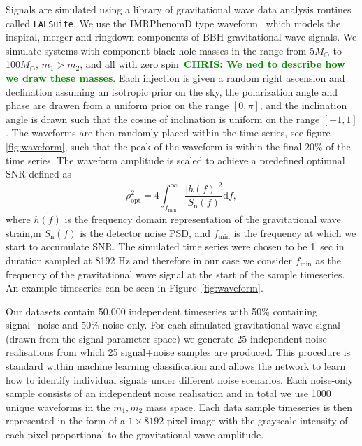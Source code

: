 \documentclass[%
 amsmath,amssymb,
 aps,
 twocolumn,
 prl,
 reprint,
floatfix,
]{revtex4-1}
\newcommand{\chris}[1]{\textbf{\textcolor{green}{CHRIS: #1}}}
\begin{document}
%
%
Signals are simulated using a library of gravitational wave data analysis
routines called \texttt{LALSuite}. We use the IMRPhenomD type
waveform~\cite{PhysRevD.93.044006, PhysRevD.93.044007} which models the
inspiral, merger and ringdown components of \ac{BBH} gravitational wave
signals. We simulate systems with component black hole masses in the range from
5\(M_\odot\) to 100\(M_\odot\), $m_{1} > m_{2}$, and all with zero
spin~\chris{We ned to describe how we draw these masses}. Each
injection is given a random right ascension and declination assuming an
isotropic prior on the sky, the polarization angle and phase are drawen from a
uniform prior on the range $[0,\pi]$, and the inclination angle is drawn such
that the cosine of inclination is uniform on the range $[-1,1]$. The waveforms
are then randomly placed within the time series, see figure \ref{fig:waveform},
such that the peak of the waveform is within the final $20$\% of the time
series. The waveform amplitude is scaled to achieve a predefined optimnal
\ac{SNR} defined as
%
%
\begin{equation} \label{eq:snr}
\rho_{\mathrm{opt}}^{2} = 4 \int_{f_{\mathrm{min}}}^{\infty} \frac{\lvert
\tilde{h(f)}\rvert^{2}}{S_{\mathrm{n}}(f)} \mathrm{d}f,
\end{equation}
%
where $\tilde{h(f)}$ is the frequency domain representation of the
gravitational wave strain,m $S_{\mathrm{n}}(f)$ is the detector noise \ac{PSD},
and $f_{\mathrm{min}}$ is the frequency at which we start to accumulate
\ac{SNR}. The simulated time series were chosen to be 1~sec in duration sampled
at 8192 Hz and therefore in our case we consider $f_{\mathrm{min}}$ as the
frequency of the gravitational wave signal at the start of the sample
timeseries. An example timeseries can be seen in Figure~\ref{fig:waveform}. 

%
%
Our datasets contain 50,000 independent timeseries with 50\% containing
signal+noise and 50\% noise-only. For each simulated gravitational wave signal
(drawn from the signal parameter space) we generate 25 independent noise
realisations from which 25 signal+noise samples are produced. This procedure is
standard within machine learning classification and allows the network to learn
how to identify individual signals under different noise scenarios. Each
noise-only sample consists of an independent noise realisation and in total we
use 1000 unique waveforms in the $m_{1},m_{2}$ mass space. Each data sample
timeseries is then represented in the form of a $1 \times 8192$ pixel image
with the grayscale intensity of each pixel proportional to the gravitational
wave amplitude.
\end{document}

